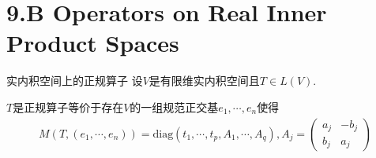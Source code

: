 \section{9.B Operators on Real Inner Product Spaces}

\begin{theorem}[9.34]\label{thm 9.34} 实内积空间上的正规算子 \:
    设\(V\)是有限维实内积空间且\(T \in L(V)\).

    \(T\)是正规算子等价于存在\(V\)的一组规范正交基\(e_1,\cdots,e_n\)使得
    \begin{align*}
        M(T,(e_1,\cdots,e_n))=\mathrm{diag}(t_1,\cdots,t_p,A_1,\cdots,A_q),A_j=
        \begin{pmatrix}
            a_j & -b_j \\
            b_j & a_j
        \end{pmatrix}
    \end{align*}
\end{theorem}

